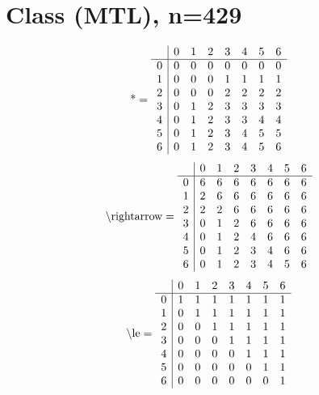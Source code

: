 \documentclass[11pt]{article}
\begin{document}
\section{Class (MTL), n=429}
\[\text{*} = 
\begin{array}{r | r r r r r r r}
 & 0 & 1 & 2 & 3 & 4 & 5 & 6 \\ \hline
0 & 0 & 0 & 0 & 0 & 0 & 0 & 0 \\
1 & 0 & 0 & 0 & 1 & 1 & 1 & 1 \\
2 & 0 & 0 & 0 & 2 & 2 & 2 & 2 \\
3 & 0 & 1 & 2 & 3 & 3 & 3 & 3 \\
4 & 0 & 1 & 2 & 3 & 3 & 4 & 4 \\
5 & 0 & 1 & 2 & 3 & 4 & 5 & 5 \\
6 & 0 & 1 & 2 & 3 & 4 & 5 & 6 \\
\end{array}
\]
\[\text{\textbackslash rightarrow} = 
\begin{array}{r | r r r r r r r}
 & 0 & 1 & 2 & 3 & 4 & 5 & 6 \\ \hline
0 & 6 & 6 & 6 & 6 & 6 & 6 & 6 \\
1 & 2 & 6 & 6 & 6 & 6 & 6 & 6 \\
2 & 2 & 2 & 6 & 6 & 6 & 6 & 6 \\
3 & 0 & 1 & 2 & 6 & 6 & 6 & 6 \\
4 & 0 & 1 & 2 & 4 & 6 & 6 & 6 \\
5 & 0 & 1 & 2 & 3 & 4 & 6 & 6 \\
6 & 0 & 1 & 2 & 3 & 4 & 5 & 6 \\
\end{array}
\]
\[\text{\textbackslash le} = 
\begin{array}{r | r r r r r r r}
 & 0 & 1 & 2 & 3 & 4 & 5 & 6 \\ \hline
0 & 1 & 1 & 1 & 1 & 1 & 1 & 1 \\
1 & 0 & 1 & 1 & 1 & 1 & 1 & 1 \\
2 & 0 & 0 & 1 & 1 & 1 & 1 & 1 \\
3 & 0 & 0 & 0 & 1 & 1 & 1 & 1 \\
4 & 0 & 0 & 0 & 0 & 1 & 1 & 1 \\
5 & 0 & 0 & 0 & 0 & 0 & 1 & 1 \\
6 & 0 & 0 & 0 & 0 & 0 & 0 & 1 \\
\end{array}
\]
\end{document}
